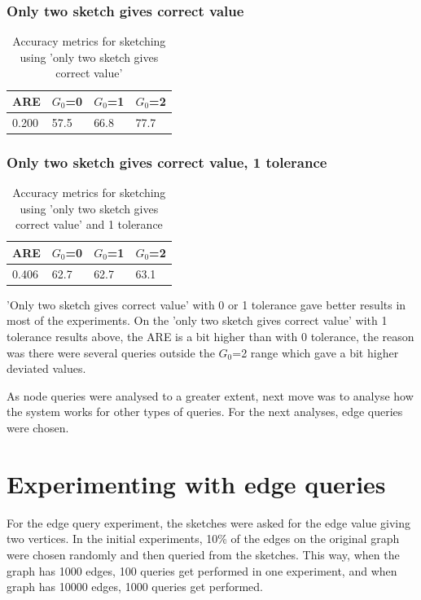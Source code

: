 \documentclass[12pt]{report}
\numberwithin{figure}{section}
\numberwithin{table}{section}
\begin{document}
\subsubsection{Only two sketch gives correct value}

\begin{table}[H]
\centering
\begin{tabular}{|l|l|l|l|}
\hline
 ARE   & $G_0$=0 & $G_0$=1 & $G_0$=2 \\ \hline
0.200 &   57.5  &   66.8  &   77.7  \\ \hline
\end{tabular}
\caption{Accuracy metrics for sketching using 'only two sketch gives correct value'}
\end{table}

\subsubsection{Only two sketch gives correct value, 1 tolerance}

\begin{table}[H]
\centering
\begin{tabular}{|l|l|l|l|}
\hline
 ARE   & $G_0$=0 & $G_0$=1 & $G_0$=2 \\ \hline
0.406 &   62.7  &   62.7  & 63.1    \\ \hline
\end{tabular}
\caption{Accuracy metrics for sketching using 'only two sketch gives correct value' and 1 tolerance}
\end{table}

'Only two sketch gives correct value' with 0 or 1 tolerance gave better results in most of the experiments. On the 'only two sketch gives correct value' with 1 tolerance results above, the ARE is a bit higher than with 0 tolerance, the reason was there were several queries outside the  $G_0$=2 range which gave a bit higher deviated values.

As node queries were analysed to a greater extent, next move was to analyse how the system works for other types of queries. For the next analyses, edge queries were chosen.

\section{Experimenting with edge queries}

For the edge query experiment, the sketches were asked for the edge value giving two vertices. In the initial experiments, 10\% of the edges on the original graph were chosen randomly and then queried from the sketches. This way, when the graph has 1000 edges, 100 queries get performed in one experiment, and when graph has 10000 edges, 1000 queries get performed.
\end{document}

